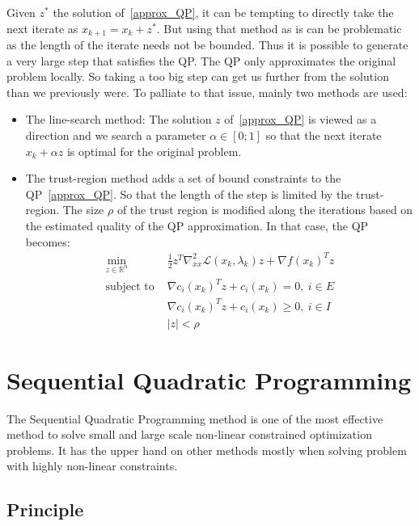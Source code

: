 Given $z^*$ the solution of~\ref{approx_QP}, it can be tempting to directly take the next iterate as $x_{k+1} = x_k + z^*$.
But using that method as is can be problematic as the length of the iterate needs not be bounded.
Thus it is possible to generate a very large step that satisfies the QP\@.
The QP only approximates the original problem locally.
So taking a too big step can get us further from the solution than we previously were.
To palliate to that issue, mainly two methods are used:
\begin{itemize}
  \item The line-search method: The solution $z$ of~\ref{approx_QP} is viewed as a direction and we search a parameter $\alpha\in [0;1]$ so that the next iterate $x_k + \alpha z$ is optimal for the original problem.
  \item The trust-region method adds a set of bound constraints to the QP~\ref{approx_QP}. So that the length of the step is limited by the trust-region. The size $\rho$ of the trust region is modified along the iterations based on the estimated quality of the QP approximation. In that case, the QP becomes:
\begin{equation}
  \begin{array}{ll}
    \min\limits_{z\in \mathbb{R}^n}{} & \frac{1}{2}z^T \nabla_{xx}^2 \mathcal{L}(x_k, \lambda_k)z + {\nabla f(x_k)}^T z \\
    \text{subject to } & {\nabla c_i(x_k)}^T z+c_i(x_k)=0,\ i\in E \\
                       & {\nabla c_i(x_k)}^T z+c_i(x_k)\geq 0,\ i\in I\\
                       & |z|<\rho
  \end{array}
\end{equation}
\end{itemize}

\section{Sequential Quadratic Programming}
\label{sec:sequential_quadratic_programming}

The Sequential Quadratic Programming method is one of the most effective method to solve small and large scale non-linear constrained optimization problems.
It has the upper hand on other methods mostly when solving problem with highly non-linear constraints.

\subsection{Principle}
\label{sub:principle}


